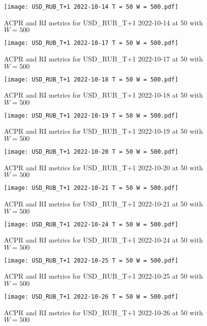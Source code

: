 \begin{figure}[htbp]
	\texttt{[image: USD\_RUB\_T+1 2022-10-14 T = 50 W = 500.pdf]}
	\caption{ACPR and RI metrics for USD\_RUB\_T+1 2022-10-14 at 50 with $W = 500$}
\end{figure}

\begin{figure}[htbp]
	\texttt{[image: USD\_RUB\_T+1 2022-10-17 T = 50 W = 500.pdf]}
	\caption{ACPR and RI metrics for USD\_RUB\_T+1 2022-10-17 at 50 with $W = 500$}
\end{figure}

\begin{figure}[htbp]
	\texttt{[image: USD\_RUB\_T+1 2022-10-18 T = 50 W = 500.pdf]}
	\caption{ACPR and RI metrics for USD\_RUB\_T+1 2022-10-18 at 50 with $W = 500$}
\end{figure}

\begin{figure}[htbp]
	\texttt{[image: USD\_RUB\_T+1 2022-10-19 T = 50 W = 500.pdf]}
	\caption{ACPR and RI metrics for USD\_RUB\_T+1 2022-10-19 at 50 with $W = 500$}
\end{figure}

\begin{figure}[htbp]
	\texttt{[image: USD\_RUB\_T+1 2022-10-20 T = 50 W = 500.pdf]}
	\caption{ACPR and RI metrics for USD\_RUB\_T+1 2022-10-20 at 50 with $W = 500$}
\end{figure}

\begin{figure}[htbp]
	\texttt{[image: USD\_RUB\_T+1 2022-10-21 T = 50 W = 500.pdf]}
	\caption{ACPR and RI metrics for USD\_RUB\_T+1 2022-10-21 at 50 with $W = 500$}
\end{figure}

\begin{figure}[htbp]
	\texttt{[image: USD\_RUB\_T+1 2022-10-24 T = 50 W = 500.pdf]}
	\caption{ACPR and RI metrics for USD\_RUB\_T+1 2022-10-24 at 50 with $W = 500$}
\end{figure}

\begin{figure}[htbp]
	\texttt{[image: USD\_RUB\_T+1 2022-10-25 T = 50 W = 500.pdf]}
	\caption{ACPR and RI metrics for USD\_RUB\_T+1 2022-10-25 at 50 with $W = 500$}
\end{figure}

\begin{figure}[htbp]
	\texttt{[image: USD\_RUB\_T+1 2022-10-26 T = 50 W = 500.pdf]}
	\caption{ACPR and RI metrics for USD\_RUB\_T+1 2022-10-26 at 50 with $W = 500$}
\end{figure}

